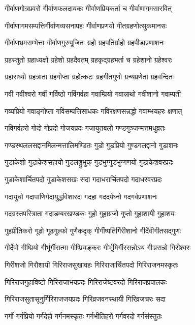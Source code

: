 \twolineshloka
{गीर्वाणगोत्रप्रवरो गीर्वाणफलदायकः}%
{गीर्वाणप्रियकर्ता च गीर्वाणागमसारवित्}%

\twolineshloka
{गीर्वाणागमसम्पत्तिर्गीर्वाणव्यसनापहः}%
{गीर्वाणप्रणयो गीतग्रहणोत्सुकमानसः}%

\twolineshloka
{गीर्वाणभ्रमसम्भेत्ता गीर्वाणगुरुपूजितः}%
{ग्रहो ग्रहपतिर्ग्राहो ग्रहपीडाप्रणाशनः}%

\twolineshloka
{ग्रहस्तुतो ग्रहाध्यक्षो ग्रहेशो ग्रहदैवतम्}%
{ग्रहकृद्ग्रहभर्ता च ग्रहेशानो ग्रहेश्वरः}%

\twolineshloka
{ग्रहाराध्यो ग्रहत्राता ग्रहगोप्ता ग्रहोत्कटः}%
{ग्रहगीतगुणो ग्रन्थप्रणेता ग्रहवन्दितः}%

\twolineshloka
{गवी गवीश्वरो गर्वी गर्विष्ठो गर्विगर्वहा}%
{गवाम्प्रियो गवान्नाथो गवीशानो गवाम्पती}%

\twolineshloka
{गव्यप्रियो गवाङ्गोप्ता गविसम्पत्तिसाधकः}%
{गविरक्षणसन्नद्धो गवाम्भयहरः क्षणात्}%

\twolineshloka
{गविगर्वहरो गोदो गोप्रदो गोजयप्रदः}%
{गजायुतबलो गण्डगुञ्जन्मत्तमधुव्रतः}%

\twolineshloka
{गण्डस्थललसद्दानमिलन्मत्तालिमण्डितः}%
{गुडो गुडप्रियो गुण्डगलद्दानो गुडाशनः}%

\twolineshloka
{गुडाकेशो गुडाकेशसहायो गुडलड्डुभुक्}%
{गुडभुग्गुडभुग्गणयो गुडाकेशवरप्रदः}%

\twolineshloka
{गुडाकेशार्चितपदो गुडाकेशसखः सदा}%
{गदाधरार्चितपदो गदाधरवरप्रदः}%

\twolineshloka
{गदायुधो गदापाणिर्गदायुद्धविशारदः}%
{गदहा गददर्पघ्नो गदगर्वप्रणाशनः}%

\twolineshloka
{गदग्रस्तपरित्राता गदाडम्बरखण्डकः}%
{गुहो गुहाग्रजो गुप्तो गुहाशायी गुहाशयः}%

\twolineshloka
{गुहप्रीतिकरो गूढो गूढगुल्फो गुणैकदृक्}%
{गीर्गीष्पतिर्गिरीशानो गीर्देवीगीतसद्गुणः}%

\twolineshloka
{गीर्देवो गीष्प्रियो गीर्भूर्गीरात्मा गीष्प्रियङ्करः}%
{गीर्भूमिर्गीरसन्नोऽथ गीःप्रसन्नो गिरीश्वरः}%

\twolineshloka
{गिरीशजो गिरौशायी गिरिराजसुखावहः}%
{गिरिराजार्चितपदो गिरिराजनमस्कृतः}%

\twolineshloka
{गिरिराजगुहाविष्टो गिरिराजाभयप्रदः}%
{गिरिराजेष्टवरदो गिरिराजप्रपालकः}%

\twolineshloka
{गिरिराजसुतासूनुर्गिरिराजजयप्रदः}%
{गिरिव्रजवनस्थायी गिरिव्रजचरः सदा}%

\twolineshloka
{गर्गो गर्गप्रियो गर्गदेहो गर्गनमस्कृतः}%
{गर्गभीतिहरो गर्गवरदो गर्गसंस्तुतः}%


